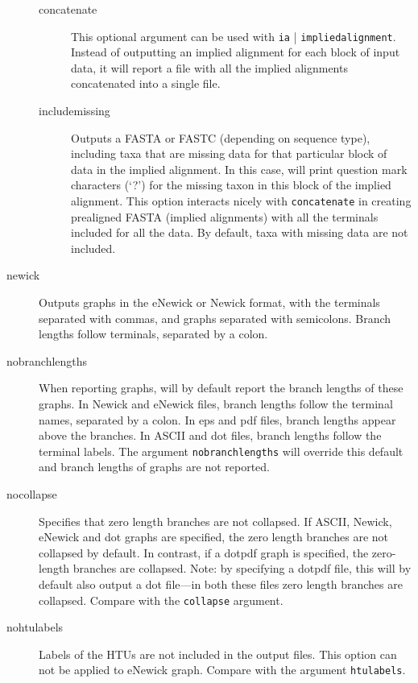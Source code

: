 \begin{description}
		\begin{description}
		
			\item[concatenate] This optional argument can be used with \texttt{ia}
			| \texttt{impliedalignment}. Instead of outputting an implied alignment 
			for each block of input data, it will report a file with all the implied 
			alignments concatenated into a single file.
			
			\item[includemissing] Outputs a FASTA or FASTC (depending on sequence type), 
			including taxa that are missing data for that particular block of data in the implied 
			alignment.
			In this case, \phyg will print question mark characters (`?') for the missing taxon in 
			this block of the implied alignment. This option interacts nicely with 
			\texttt{concatenate} in creating prealigned FASTA (implied alignments) 
			with all the terminals included for all the data. By default, taxa with 
			missing data are not included.
			
		\end{description}
				
		\item[newick] Outputs graphs in the eNewick or Newick format, with the terminals
		separated with commas, and graphs separated with semicolons. Branch
		lengths follow terminals, separated by a colon.
		
		\item[nobranchlengths] When reporting graphs, \phyg will by default 
		report the branch lengths of these graphs. In Newick and eNewick files, 
		branch lengths follow the terminal names, separated by a colon. In eps 
		and pdf files, branch lengths appear above the branches. In ASCII and 
		dot files, branch lengths follow the terminal labels. The argument
		\texttt{nobranchlengths} will override this default and branch lengths 
		of graphs are not reported.
		
		\item[nocollapse] Specifies that zero length branches are not collapsed.
		If ASCII, Newick, eNewick and dot graphs are specified, the zero length 
		branches are not collapsed by default. In contrast, if a dotpdf graph is 
		specified, the zero-length branches are collapsed. Note: by specifying 
		a dotpdf file, this will by default also output a dot file---in both these files 
		zero length branches are collapsed. Compare with the \texttt{collapse} 
		argument. 
				
		\item[nohtulabels] Labels of the HTUs are not included in the output files. 
		This option can not be applied to eNewick graph. Compare with the argument 
		\texttt{htulabels}.
		

\end{description}
